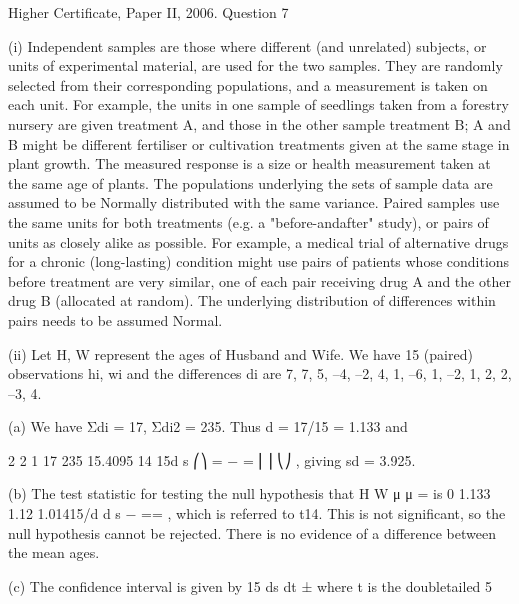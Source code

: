 \documentclass[a4paper,12pt]{article}
\begin{document}
Higher Certificate, Paper II, 2006.  Question 7 
 
 
(i) Independent samples are those where different (and unrelated) subjects, or units of experimental material, are used for the two samples.  They are randomly selected from their corresponding populations, and a measurement is taken on each unit.  For example, the units in one sample of seedlings taken from a forestry nursery are given treatment A, and those in the other sample treatment B;  A and B might be different fertiliser or cultivation treatments given at the same stage in plant growth.  The measured response is a size or health measurement taken at the same age of plants. 
 The populations underlying the sets of sample data are assumed to be Normally distributed with the same variance. 
 Paired samples use the same units for both treatments (e.g. a "before-andafter" study), or pairs of units as closely alike as possible.  For example, a medical trial of alternative drugs for a chronic (long-lasting) condition might use pairs of patients whose conditions before treatment are very similar, one of each pair receiving drug A and the other drug B (allocated at random). 
 The underlying distribution of differences within pairs needs to be assumed Normal. 
 
 
(ii) Let H, W represent the ages of Husband and Wife.  We have 15 (paired) observations hi, wi and the differences di are 
 7,  7,  5,  –4,  –2,  4,  1,  –6,  1,  –2,  1,  2,  2,  –3,  4. 
 
 
(a) We have Σdi = 17,  Σdi2 = 235.  Thus d = 17/15 = 1.133 and 
 
2 2 1 17 235 15.4095 14 15d s ⎛⎞ = − = ⎜⎟ ⎝⎠
,  giving sd = 3.925. 
 
 
(b) The test statistic for testing the null hypothesis that H W μ μ = is 
 0 1.133 1.12 1.01415/d d s − == , 
 which is referred to t14.  This is not significant, so the null hypothesis cannot be rejected.  There is no evidence of a difference between the mean ages. 
 
 
(c) The confidence interval is given by 
15 ds dt ± where t is the doubletailed 5%
\end{document}

